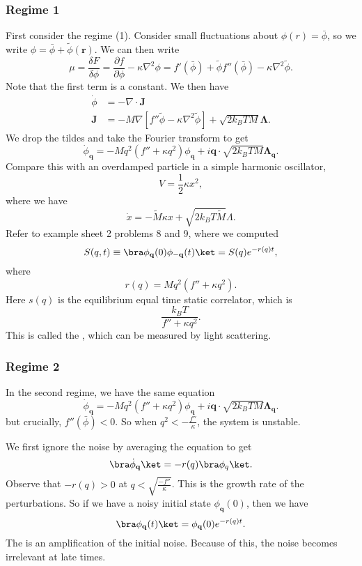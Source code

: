 \documentclass[a4paper]{article}
\begin{document}
\subsubsection*{Regime 1}
First consider the regime (1). Consider small fluctuations about $\phi(r) = \bar{\phi}$, so we write $\phi = \bar{\phi} + \tilde{\phi}(\mathbf{r})$. We can then write
\[
  \mu = \frac{\delta F}{\delta \phi} = \frac{\partial f}{\partial \phi} - \kappa \nabla^2 \phi = f'(\bar{\phi}) + \tilde{\phi} f''(\bar{\phi}) - \kappa \nabla^2 \tilde{\phi}.
\]
Note that the first term is a constant. We then have
\begin{align*}
  \dot{\phi} &= - \nabla \cdot \mathbf{J}\\
  \mathbf{J} &= -M \nabla [f''\tilde{\phi} - \kappa \nabla^2 \tilde{\phi}] + \sqrt{2k_B T M} \boldsymbol\Lambda.
\end{align*}
We drop the tildes and take the Fourier transform to get
\[
  \dot{\phi}_{\mathbf{q}} = - M q^2 (f'' + \kappa q^2)\phi_{\mathbf{q}} + i\mathbf{q} \cdot \sqrt{2k_B TM} \boldsymbol\Lambda_{\mathbf{q}}.
\]
Compare this with an overdamped particle in a simple harmonic oscillator,
\[
  V = \frac{1}{2} \kappa x^2,
\]
where we have
\[
  \dot{x} = - \tilde{M} \kappa x + \sqrt{2k_B T \tilde{M}} \Lambda.
\]
Refer to example sheet 2 problems 8 and 9, where we computed
\[
  S(q, t) \equiv \bra \phi_\mathbf{q}(0) \phi_{-\mathbf{q}} (t)\ket = S(q) e^{-r(q) t},
\]
where
\[
  r(q) = Mq^2(f'' + \kappa q^2).
\]
Here $s(q)$ is the equilibrium equal time static correlator, which is
\[
  \frac{k_B T}{f'' + \kappa q^2}.
\]
This  is called the , which can be measured by light scattering.
\subsubsection*{Regime 2}
In the second regime, we have the same equation
\[
  \dot{\phi}_{\mathbf{q}} = - M q^2 (f'' + \kappa q^2)\phi_\mathbf{q} + i\mathbf{q} \cdot \sqrt{2k_B TM} \boldsymbol\Lambda_{\mathbf{q}}.
\]
but crucially, $f''(\bar{\phi}) < 0$. So when $q^2 < - \frac{f''}{\kappa}$, the system is unstable.

We first ignore the noise by averaging the equation to get
\[
  \bra \dot{\phi}_\mathbf{q}\ket = - r(q) \bra \phi_q\ket.
\]
Observe that $-r(q) > 0$ at $q < \sqrt{\frac{-f''}{\kappa}}$. This is the growth rate of the perturbations. So if we have a noisy initial state $\phi_\mathbf{q}(0)$, then we have
\[
  \bra \phi_\mathbf{q}(t)\ket = \phi_\mathbf{q}(0) e^{-r(q)t}.
\]
The is an amplification of the initial noise. Because of this, the noise becomes irrelevant at late times.
\end{document}
